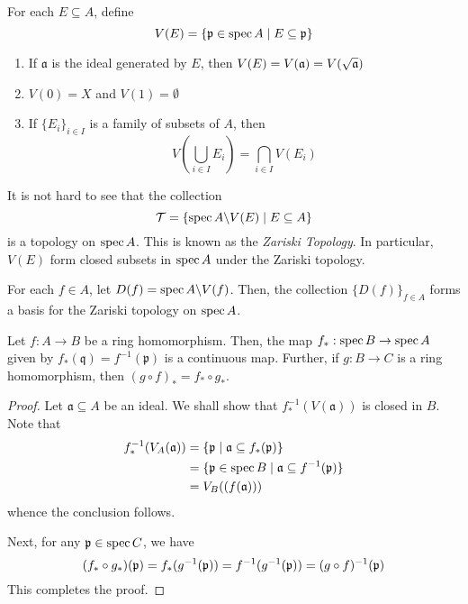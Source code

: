 For each $E\subseteq A$, define 
\begin{equation*}
    V(E) = \{\mathfrak p\in\operatorname{spec} A\mid E\subseteq\mathfrak p\}
\end{equation*}

\begin{proposition}
\begin{enumerate}[label=(\alph*)]
    \item If $\mathfrak a$ is the ideal generated by $E$, then $V(E) = V(\mathfrak a) = V(\sqrt{\mathfrak a})$
    \item $V(0) = X$ and $V(1) = \emptyset$ 
    \item If $\{E_i\}_{i\in I}$ is a family of subsets of $A$, then 
    \begin{equation*}
        V\left(\bigcup_{i\in I}E_i\right) = \bigcap_{i\in I}V(E_i)
    \end{equation*}
\end{enumerate}
\end{proposition}

It is not hard to see that the collection 
\begin{equation*}
    \mathcal T = \{\operatorname{spec} A\backslash V(E)\mid E\subseteq A\}
\end{equation*}
is a topology on $\operatorname{spec} A$. This is known as the \textit{Zariski Topology}. In particular, $V(E)$ form closed subsets in $\operatorname{spec} A$ under the Zariski topology. 

\begin{proposition}
    For each $f\in A$, let $D(f) = \operatorname{spec} A\backslash V(f)$. Then, the collection $\{D(f)\}_{f\in A}$ forms a basis for the Zariski topology on $\operatorname{spec} A$.
\end{proposition}

\begin{proposition}
    Let $f: A\to B$ be a ring homomorphism. Then, the map $f_*:\operatorname{spec} B\to\operatorname{spec} A$ given by $f_*(\mathfrak q) = f^{-1}(\mathfrak p)$ is a continuous map. Further, if $g: B\to C$ is a ring homomorphism, then $(g\circ f)_* = f_*\circ g_*$.
\end{proposition}
\begin{proof}
    Let $\mathfrak a\subseteq A$ be an ideal. We shall show that $f_*^{-1}(V(\mathfrak a))$ is closed in $B$. Note that 
    \begin{align*}
        f_*^{-1}(V_A(\mathfrak a)) &= \{\mathfrak p\mid \mathfrak a\subseteq f_*(\mathfrak p)\}\\
        &= \{\mathfrak p\in\operatorname{spec} B\mid\mathfrak a\subseteq f^{-1}(\frak p)\}\\
        &= V_B((f(\mathfrak a)))
    \end{align*}
    whence the conclusion follows.

    Next, for any $\mathfrak p\in\operatorname{spec} C$, we have 
    \begin{equation*}
        (f_*\circ g_*)(\mathfrak p) = f_*(g^{-1}(\mathfrak p)) = f^{-1}(g^{-1}(\mathfrak p)) = (g\circ f)^{-1}(\mathfrak p)
    \end{equation*}
    This completes the proof.
\end{proof}

